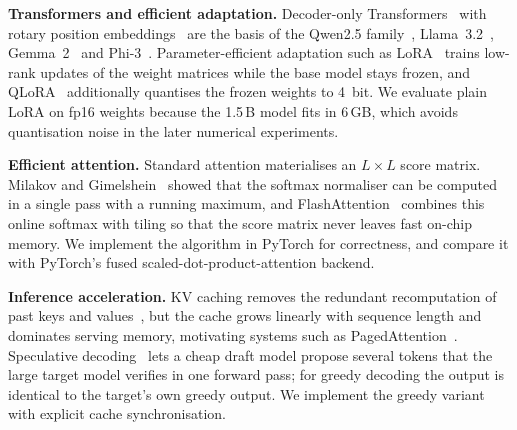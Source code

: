 \textbf{Transformers and efficient adaptation.} Decoder-only Transformers~\cite{vaswani2017attention} with rotary position embeddings~\cite{su2024roformer} are the basis of the Qwen2.5 family~\cite{qwen2024qwen25}, Llama~3.2~\cite{meta2024llama32}, Gemma~2~\cite{gemma2024gemma2} and Phi-3~\cite{abdin2024phi3}. Parameter-efficient adaptation such as LoRA~\cite{hu2022lora} trains low-rank updates of the weight matrices while the base model stays frozen, and QLoRA~\cite{dettmers2023qlora} additionally quantises the frozen weights to 4~bit. We evaluate plain LoRA on fp16 weights because the 1.5\,B model fits in 6\,GB, which avoids quantisation noise in the later numerical experiments.

\textbf{Efficient attention.} Standard attention materialises an $L\times L$ score matrix. Milakov and Gimelshein~\cite{milakov2018online} showed that the softmax normaliser can be computed in a single pass with a running maximum, and FlashAttention~\cite{dao2022flashattention} combines this online softmax with tiling so that the score matrix never leaves fast on-chip memory. We implement the algorithm in PyTorch for correctness, and compare it with PyTorch's fused scaled-dot-product-attention backend.

\textbf{Inference acceleration.} KV caching removes the redundant recomputation of past keys and values~\cite{pope2023efficiently}, but the cache grows linearly with sequence length and dominates serving memory, motivating systems such as PagedAttention~\cite{kwon2023pagedattention}. Speculative decoding~\cite{leviathan2023speculative,chen2023speculative} lets a cheap draft model propose several tokens that the large target model verifies in one forward pass; for greedy decoding the output is identical to the target's own greedy output. We implement the greedy variant with explicit cache synchronisation.
